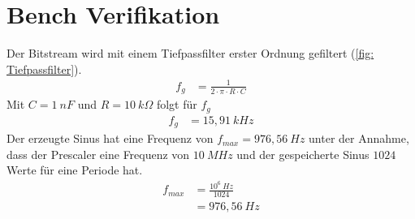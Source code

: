 \documentclass[./\jobname.tex]{subfiles}
\begin{document}
\section{Bench Verifikation}
%
Der Bitstream wird mit einem Tiefpassfilter erster Ordnung gefiltert (\autoref{fig: Tiefpassfilter}).
%
\begin{align}
f_{g}&= \frac{1}{2 \cdot \pi \cdot R \cdot C}
\end{align}
%
Mit \(C=1~nF\) und \(R=10~k\Omega\) folgt für \(f_{g}\)
%
\begin{align}
	f_{g}&= 15,91~kHz
\end{align}
%
Der erzeugte Sinus hat eine Frequenz von \(f_{max}=976,56~Hz\) unter der Annahme, dass der Prescaler eine Frequenz von \(10~MHz\) und der gespeicherte Sinus \(1024\) Werte für eine Periode hat.
%
\begin{align}
f_{max}&=\frac{10^{6}~Hz}{1024}\\
&=976,56~Hz
\end{align}
%
\def\bildA{false}
\begin{figure}[H]
	\centering
	\noindent{}
	\label{fig: Tiefpassfilter}
\end{figure}
%
\begin{figure}[H]
	\centering
	\noindent{}
	\label{fig: oszi_dutytrack}
\end{figure}
%
\begin{figure}[H]
	\centering
	\noindent{}
	\label{fig: ramp.png}
\end{figure}
%
\begin{figure}[H]
	\centering
	\noindent{}
	\label{fig: triangle.png}
\end{figure}
%
\begin{figure}[H]
	\centering
	\noindent{}
	\label{fig: square.png}
\end{figure}
%
\end{document}
